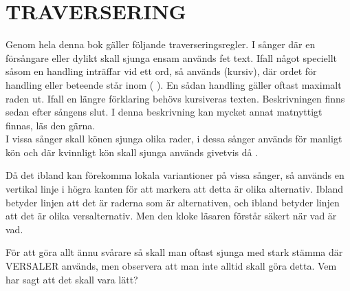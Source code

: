 \documentclass[a6paper,fontsize=10pt,twoside,openright]{scrbook}
\begin{document}
\section{TRAVERSERING}\vspace{10pt}
\hspace{\indent}Genom hela denna bok gäller följande traverseringsregler. I sånger där
en försångare eller dylikt skall sjunga ensam används fet text. Ifall
något speciellt såsom en handling inträffar vid ett ord, så används
(kursiv), där ordet för handling eller beteende står inom ( ). En
sådan handling gäller oftast maximalt raden ut. Ifall en längre
förklaring behövs kursiveras texten. Beskrivningen finns sedan efter
sångens slut. I denna beskrivning kan mycket annat matnyttigt finnas,
läs den gärna.\\ \indent I vissa sånger skall könen sjunga olika
rader, i dessa sånger används {\Large\Male} för manligt kön och där
kvinnligt kön skall sjunga används givetvis då {\Large\Female}.
\begin{leftborder}
  \hspace{\indent}Då det ibland kan förekomma lokala variantioner på vissa sånger, så
  används en  vertikal linje i högra kanten för att markera att detta
  är olika alternativ. Ibland betyder linjen att det är raderna som är
  alternativen, och ibland betyder linjen att det är olika
  versalternativ. Men den kloke läsaren förstår säkert när vad är vad.
\end{leftborder}
\hspace{15pt} För att göra allt ännu svårare så skall man oftast sjunga med stark
stämma där VERSALER används, men observera att man inte alltid skall
göra detta. Vem har sagt att det skall vara lätt?
\newpage
\cleardoublepage
\renewcommand{\contentsname}{\vspace{-2.17cm}\rmfamily{\fontsize{13}{15}\textbf{INNEHÅLL}}\vspace{-1.2cm}}
\tableofcontents

\renewcommand{\leftmark}{}
\end{document}
